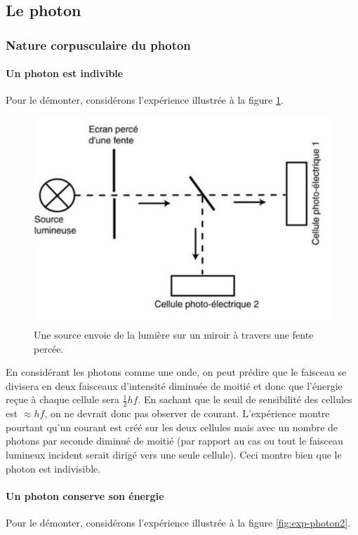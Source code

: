 \subsection{Le photon}
\subsubsection{Nature corpusculaire du photon}
\paragraph{Un photon est indivible}
Pour le démonter, considérons
l'expérience illustrée à la figure \ref{fig:exp-photon1}.

\begin{figure}[ht!]
	\centering
	\includegraphics[scale=0.5]{exp_photon_1.jpg}
	\caption{Une source envoie de la lumière sur un miroir
	à travers une fente percée.}
	\label{fig:exp-photon1}
\end{figure}

En considérant les photons comme une onde, on peut prédire
que le faisceau se divisera en deux faisceaux d'intensité diminuée
de moitié et donc que l'énergie reçue à chaque cellule sera $\frac{1}{2}hf$.
En sachant que le seuil de sensibilité des cellules est $\approx hf$,
on ne devrait donc pas observer de courant. L'expérience
montre pourtant qu'un courant est créé sur les deux cellules mais
avec un nombre de photons par seconde diminué de moitié (par rapport
au cas ou tout le faisceau lumineux incident serait dirigé vers une seule
cellule). Ceci montre bien que le photon est indivisible.

\paragraph{Un photon conserve son énergie}
Pour le démonter, considérons l'expérience illustrée
à la figure \ref{fig:exp-photon2}.

